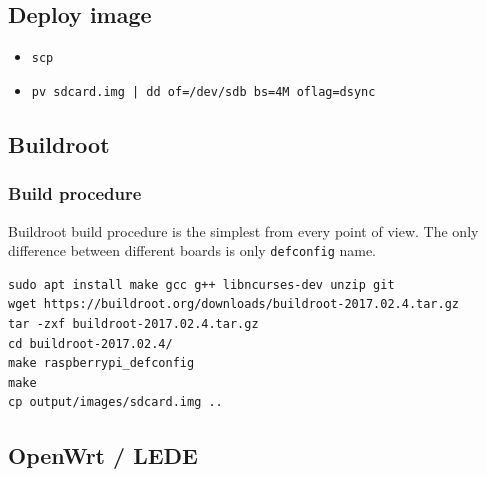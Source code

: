 \documentclass[printmode]{mgr}
\begin{document}
\subsection{Deploy image}

\begin{itemize}
  \item \verb|scp|
  \item \verb!pv sdcard.img | dd of=/dev/sdb bs=4M oflag=dsync!
\end{itemize}

\subsection{Buildroot}



\subsubsection{Build procedure}

Buildroot build procedure is the simplest from every point of view.
The only difference between different boards is only \verb|defconfig| name.

\begin{lstlisting}
sudo apt install make gcc g++ libncurses-dev unzip git
wget https://buildroot.org/downloads/buildroot-2017.02.4.tar.gz
tar -zxf buildroot-2017.02.4.tar.gz
cd buildroot-2017.02.4/
make raspberrypi_defconfig
make
cp output/images/sdcard.img ..
\end{lstlisting}







\subsection{OpenWrt / LEDE}
\end{document}

